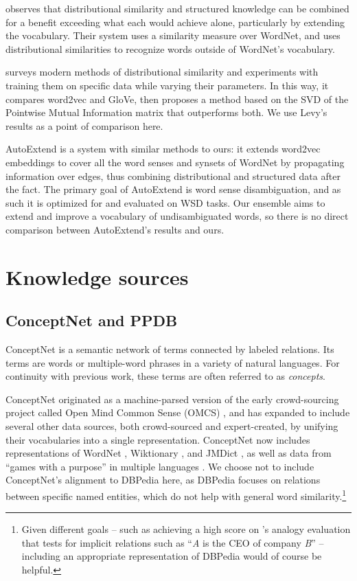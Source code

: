 \documentclass[11pt,letterpaper]{article}
\begin{document}
 observes that distributional similarity and
structured knowledge can be combined for a benefit exceeding what each would
achieve alone, particularly by extending the vocabulary. Their system uses a
similarity measure over WordNet, and uses distributional similarities to
recognize words outside of WordNet's vocabulary.

 surveys modern methods of distributional similarity
and experiments with training them on specific data while varying their
parameters. In this way, it compares word2vec and GloVe, then proposes a method
based on the SVD of the Pointwise Mutual Information matrix that outperforms
both. We use Levy's results as a point of comparison here.

AutoExtend \cite{rothe2015autoextend} is a system with similar methods to
ours: it extends word2vec embeddings to cover all the word senses and synsets of
WordNet by propagating information over edges, thus combining distributional and
structured data after the fact. The primary goal of AutoExtend is word sense
disambiguation, and as such it is optimized for and evaluated on WSD tasks.
Our ensemble aims to extend and improve a vocabulary of undisambiguated words,
so there is no direct comparison between AutoExtend's results and ours.

\section{Knowledge sources}

\subsection{ConceptNet and PPDB}
ConceptNet \cite{speer2012conceptnet} is a semantic network of terms
connected by labeled relations. Its terms are words or multiple-word phrases
in a variety of natural languages. For continuity with previous work,
these terms are often referred to as {\em concepts}.

ConceptNet originated as a machine-parsed version of the early crowd-sourcing
project called Open Mind Common Sense (OMCS) \cite{singh2002omcs}, and has expanded
to include several other data sources, both crowd-sourced and expert-created,
by unifying their vocabularies into a single representation. ConceptNet now includes
representations of WordNet \cite{miller1998wordnet}, Wiktionary \cite{wiktionary2014en},
and JMDict \cite{breen2004jmdict}, as well as data from ``games with a purpose'' in
multiple languages \cite{vonahn2006verbosity,kuo2009petgame,nakahara2011nadya}.
We choose not to include ConceptNet's alignment to DBPedia
\cite{auer2007dbpedia}
here, as DBPedia focuses on relations between specific named entities, which do not help
with general word similarity.\footnote{
    Given different goals -- such as achieving a high score on
    's analogy evaluation that tests for
    implicit relations such as ``{\em A} is the CEO of company {\em B}'' --
    including an appropriate representation of DBPedia would of course be helpful.
}
\end{document}
